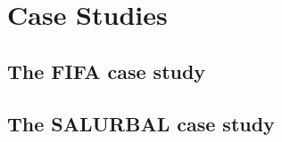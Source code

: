\chapter{Case Studies}
\label{chapter5}

\graphicspath{{Chapter5/figs/}}

\section{The FIFA case study} %
\label{section5.1}



\section{The SALURBAL case study} %
\label{section5.2}